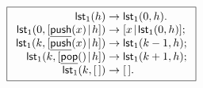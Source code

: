 \documentclass[11pt]{article}
\begin{document}
\TeXtoEPS
\(
\boxed{
\begin{array}{r@{\;}c@{\;}l}
\fun{lst}_1(h) & \rightarrow & \fun{lst}_1(0,h).\\
\fun{lst}_1(0,\cons{\ufun{push}(x)}{h}) & \rightarrow
                                     & \cons{x}{\fun{lst}_1(0,h)};\\
\fun{lst}_1(k,\cons{\ufun{push}(x)}{h}) & \rightarrow & \fun{lst}_1(k-1,h);\\
\fun{lst}_1(k,\cons{\ufun{pop}()}{h}) & \rightarrow & \fun{lst}_1(k+1,h);\\
\fun{lst}_1(k,\el)         & \rightarrow & \el.
\end{array}}
\)
\endTeXtoEPS
\end{document}
